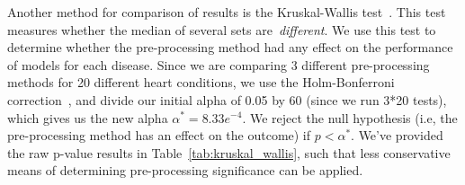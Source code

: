 \documentclass[pmlr,twocolumn]{jmlr}%
\begin{document}
Another method for comparison of results is the Kruskal-Wallis test~\citep{kruskal1952use,ostertagova2014methodology}. This test measures whether the median of several sets are~\textit{different}. We use this test to determine whether the pre-processing method had any effect on the performance of models for each disease. Since we are comparing 3 different pre-processing methods for 20 different heart conditions, we use the Holm-Bonferroni correction~\citep{holm1979simple,abdi2010holm}, and divide our initial alpha of 0.05 by 60 (since we run 3*20 tests), which gives us the new alpha $\alpha^*=8.33e^{-4}$. We reject the null hypothesis (i.e, the pre-processing method has an effect on the outcome) if $p<\alpha^*$. We've provided the raw p-value results in Table~\ref{tab:kruskal_wallis}, such that less conservative means of determining pre-processing significance can be applied.
\end{document}
